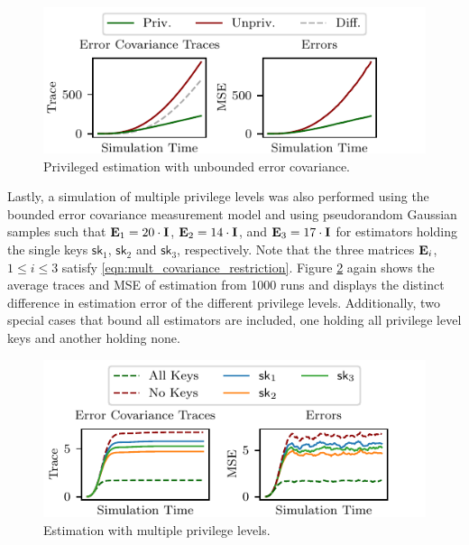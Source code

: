 \documentclass[letterpaper, 10 pt, conference]{ieeeconf}
\begin{document}
\begin{figure}[htbp]
   \centering
   \vspace{-.5 \baselineskip}
   \includegraphics{pictures/single_level_unbounded.pdf}
   \caption{Privileged estimation with unbounded error covariance.}
   \vspace{-.5 \baselineskip}
   \label{fig:single_unbounded}
\end{figure}

Lastly, a simulation of multiple privilege levels was also performed using the bounded error covariance measurement model and using pseudorandom Gaussian samples such that ${{\mathbf{E}}}_1=20 \cdot {\ensuremath{{\mathbf{I}}}}$, ${{\mathbf{E}}}_2=14 \cdot {\ensuremath{{\mathbf{I}}}}$, and ${{\mathbf{E}}}_3=17 \cdot {\ensuremath{{\mathbf{I}}}}$ for estimators holding the single keys $\mathsf{sk}_1$, $\mathsf{sk}_2$ and $\mathsf{sk}_3$, respectively. Note that the three matrices ${{\mathbf{E}}}_i$, $1 \leq i \leq 3$ satisfy \eqref{eqn:mult_covariance_restriction}. Figure \ref{fig:multiple_bounded} again shows the average traces and MSE of estimation from 1000 runs and displays the distinct difference in estimation error of the different privilege levels. Additionally, two special cases that bound all estimators are included, one holding all privilege level keys and another holding none.

\begin{figure}[htbp]
   \centering
   \vspace{-.5 \baselineskip}
   \includegraphics{pictures/multiple_level.pdf}
   \caption{Estimation with multiple privilege levels.}
   \vspace{-.5 \baselineskip}
   \label{fig:multiple_bounded}
\end{figure}
\end{document}
